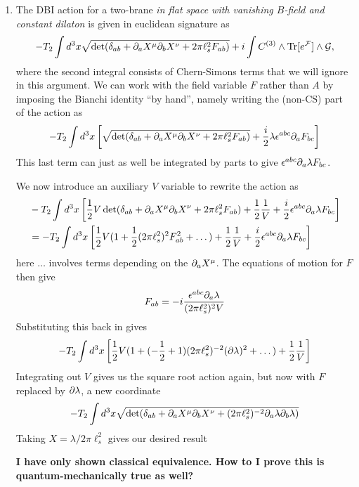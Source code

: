 \documentclass[11pt, class=article, crop=false]{standalone}
\begin{document}
\begin{enumerate}
	\item The DBI action for a two-brane \emph{in flat space with vanishing $B$-field and constant dilaton} is given in euclidean signature as
	\[
		- T_2 \int d^3 x \sqrt{\det (\delta_{ab} + \partial_a X^\mu \partial_b X^\nu + 2 \pi \ell_s^2 F_{ab})} + i \int C^{(3)} \wedge \mathrm{Tr}[e^{\mathcal F}] \wedge \mathcal G,
	\]
	where the second integral consists of Chern-Simons terms that we will ignore in this argument. We can work with the field variable $F$ rather than $A$ by imposing the Bianchi identity ``by hand'', namely writing the (non-CS) part of the action as
	\[
		-T_2 \int d^3 x \left[ \sqrt{\det (\delta_{ab} + \partial_a X^\mu \partial_b X^\nu + 2 \pi \ell_s^2 F_{ab})} + \frac{i}{2} \lambda \epsilon^{abc} \partial_a F_{b c} \right]
	\]
	This last term can just as well be integrated by parts to give $\epsilon^{abc} \partial_a \lambda F_{bc}$.
	
	We now introduce an auxiliary $V$ variable to rewrite the action as
	\[
	\begin{aligned}
		&-T_2 \int d^3 x \left[\frac12 V \det(\delta_{ab} + \partial_a X^\mu \partial_b X^\nu + 2 \pi \ell_s^2 F_{ab})  + \frac12 \frac1V + \frac{i}{2}\epsilon^{abc} \partial_a \lambda F_{bc} \right]\\
		& = -T_2 \int d^3 x \left[\frac12 V (1 + \frac12 (2\pi \ell_s^2)^2 F_{ab}^2  + \dots ) + \frac12 \frac{1}{V} + \frac{i}{2}\epsilon^{abc} \partial_a \lambda F_{bc} \right]
	\end{aligned}
	\]
	here $\dots$ involves terms depending on the $\partial_a X^\mu$.
	The equations of motion for $F$ then give 
	\[
		F_{ab} = - i \frac{\epsilon^{abc} \partial_a \lambda}{(2 \pi \ell_s^2)^2 V}
	\]
	Substituting this back in gives
	\[
		 -T_2 \int d^3 x  \left[ \frac12 V (1 + (- \frac12 + 1) (2 \pi \ell_s^2)^{-2} (\partial \lambda)^2 + \dots ) + \frac12 \frac{1}{V} \right]
	\]
	Integrating out $V$ gives us the square root action again, but now with $F$ replaced by $\partial \lambda$, a new coordinate 
	\[
		- T_2 \int d^3 x \sqrt{\det (\delta_{ab} +\partial_a X^\mu \partial_b X^\nu +  (2 \pi \ell_s^2)^{-2}  \partial_a \lambda \partial_b \lambda )}
	\]
	Taking $X = \lambda / 2\pi \ell_s^2$ gives our desired result
	
	\textbf{I have only shown classical equivalence. How to I prove this is quantum-mechanically true as well?}
	
	

\end{enumerate}
\end{document}
